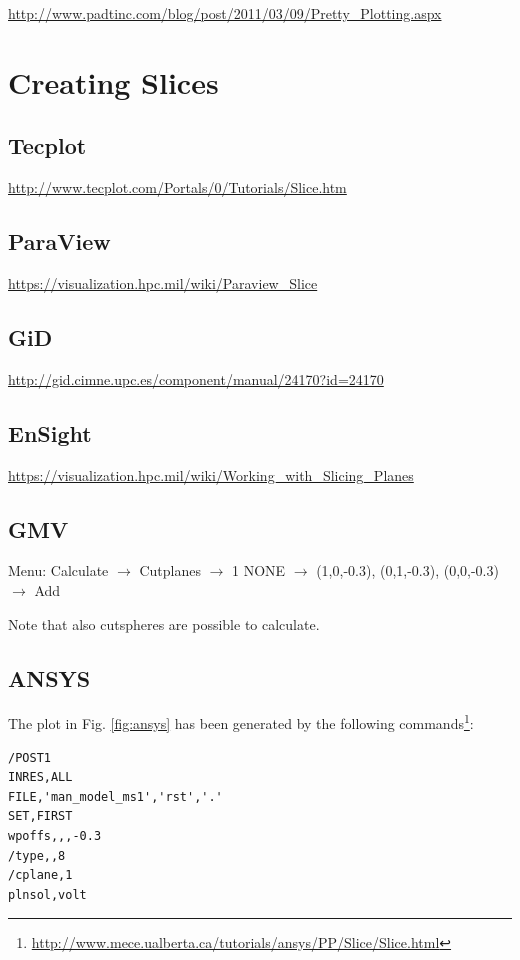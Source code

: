 \url{http://www.padtinc.com/blog/post/2011/03/09/Pretty_Plotting.aspx}

\section{Creating Slices}

\subsection{Tecplot}
\url{http://www.tecplot.com/Portals/0/Tutorials/Slice.htm}

\subsection{ParaView}
\url{https://visualization.hpc.mil/wiki/Paraview_Slice}

\subsection{GiD}
\url{http://gid.cimne.upc.es/component/manual/24170?id=24170}

\subsection{EnSight}
\url{https://visualization.hpc.mil/wiki/Working_with_Slicing_Planes}

\subsection{GMV}

\noindent  Menu:  Calculate  $\rightarrow$   Cutplanes  $\rightarrow$  1  NONE
$\rightarrow$ (1,0,-0.3), (0,1,-0.3), (0,0,-0.3) $\rightarrow$ Add

Note that also cutspheres are possible to calculate.

\subsection{ANSYS}

The  plot  in  Fig.   \ref{fig:ansys}  has been  generated  by  the  following
commands\footnote{\url{http://www.mece.ualberta.ca/tutorials/ansys/PP/Slice/Slice.html}}:

\begin{verbatim}
/POST1  
INRES,ALL   
FILE,'man_model_ms1','rst','.' 
SET,FIRST
wpoffs,,,-0.3
/type,,8
/cplane,1
plnsol,volt
\end{verbatim}%
%


